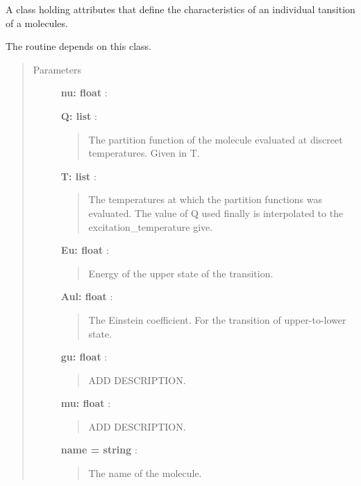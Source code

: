 \documentclass[a4paper,10pt,english]{sphinxmanual}
\begin{document}
\begin{fulllineitems}
\label{lte:astrolyze.lte.molecule_parameter.Molecule}
A class holding attributes that define the characteristics of an
individual tansition of a molecules.

The  routine
depends on this class.
\begin{quote}\begin{description}
\item[{Parameters }] \leavevmode
\textbf{nu: float} :

\textbf{Q: list} :
\begin{quote}

The partition function of the molecule evaluated at discreet
temperatures. Given in T.
\end{quote}

\textbf{T: list} :
\begin{quote}

The temperatures at which the partition functions was evaluated. The
value of Q used finally is interpolated to the excitation\_temperature
give.
\end{quote}

\textbf{Eu: float} :
\begin{quote}

Energy of the upper state of the transition.
\end{quote}

\textbf{Aul: float} :
\begin{quote}

The Einstein coefficient. For the transition of upper-to-lower state.
\end{quote}

\textbf{gu: float} :
\begin{quote}

ADD DESCRIPTION.
\end{quote}

\textbf{mu: float} :
\begin{quote}

ADD DESCRIPTION.
\end{quote}

\textbf{name = string} :
\begin{quote}

The name of the molecule.
\end{quote}

\end{description}\end{quote}

\end{fulllineitems}
\end{document}
